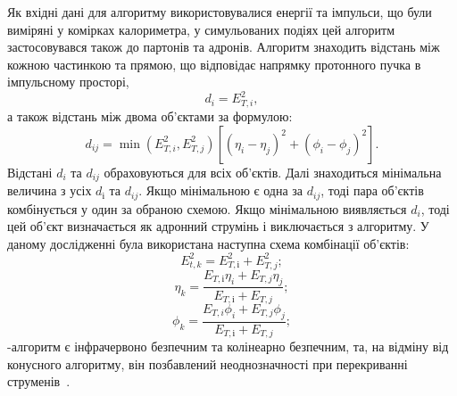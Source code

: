 Як вхідні дані для алгоритму використовувалися енергії та імпульси, що були виміряні у комірках калориметра, у симульованих подіях цей алгоритм застосовувався також до партонів та адронів. Алгоритм знаходить відстань між кожною частинкою та прямою, що відповідає напрямку протонного пучка в імпульсному просторі,
\begin{equation}
	d_{i} = E_{T,i}^{2},	
\end{equation}
а також відстань між двома об'єктами за формулою:
\begin{equation}
	d_{ij} = \min\left(E_{T,i}^{2}, E_{T,j}^{2}\right)\left[\left(\eta_{i} - \eta_{j}\right)^{2} + \left(\phi_{i} - \phi_{j}\right)^{2}\right].
\end{equation}
Відстані $d_{i}$ та $d_{ij}$ обраховуються для всіх об'єктів. Далі знаходиться мінімальна величина з усіх $d_і$ та $d_{ij}$. Якщо мінімальною є одна за $d_{ij}$, тоді пара об'єктів комбінується у один за обраною схемою. Якщо мінімальною виявляється $d_{i}$, тоді цей об'єкт визначається як адронний струмінь і виключається з алгоритму. У даному дослідженні була використана наступна схема комбінації об'єктів:
\begin{equation}
	E_{t,k}^{2} = E_{T,і}^{2} + E_{T,j}^{2};
\end{equation}
\begin{equation}
	\eta_{k} = \frac{E_{T,і}\eta_{i} + E_{T,j}\eta_{j}}{E_{T,і} + E_{T,j}};
\end{equation}
\begin{equation}
	\phi_{k} = \frac{E_{T,i}\phi_{i} + E_{T,j}\phi_{j}}{E_{T,і} + E_{T,j}};
\end{equation}
\kt-алгоритм є інфрачервоно безпечним та колінеарно безпечним, та, на відміну від конусного алгоритму, він позбавлений неоднозначності при перекриванні струменів~\cite{salam:antikt}.
